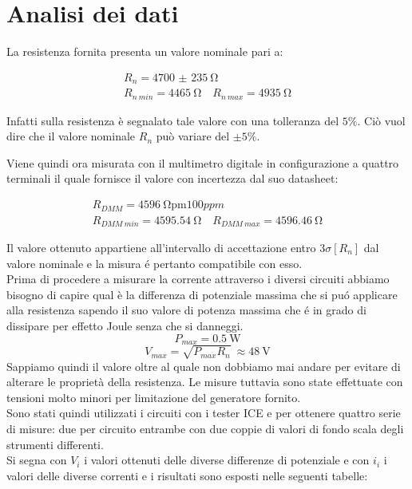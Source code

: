 \documentclass{article}
\begin{document}
\newpage


\section{Analisi dei dati}

La resistenza fornita presenta un valore nominale pari a:

\begin{gather}
    R_n = \SI{4700(235)}{\ohm} \\
    \nonumber
    R_{n\ min} = \SI{4465}{\ohm} \quad
    R_{n\ max} = \SI{4935}{\ohm}
\end{gather}

Infatti sulla resistenza è segnalato tale valore con una tolleranza del $5\%$. Ciò vuol dire che il valore nominale $R_n$ può variare del $\pm 5\%$.

Viene quindi ora misurata con il multimetro digitale in configurazione a quattro terminali il quale fornisce il valore con incertezza dal suo datasheet:

\begin{gather}
    R_{DMM} = \SI{4596}{\ohm \pm 100 ppm} \\
    \nonumber
    R_{DMM\ min} = \SI{4595.54}{\ohm} \quad
    R_{DMM\ max} = \SI{4596.46}{\ohm}
\end{gather}

Il valore ottenuto appartiene all'intervallo di accettazione entro $3 \sigma[R_n]$ dal valore nominale e la misura \'e pertanto compatibile con esso. \\
Prima di procedere a misurare la corrente attraverso i diversi circuiti abbiamo bisogno di capire qual è la differenza di potenziale massima che si pu\'o applicare alla resistenza sapendo il suo valore di potenza massima che \'e in grado di dissipare per effetto Joule senza che si danneggi.
\begin{equation}
    P_{max} = 0.5\ \si{\watt}
\end{equation}
\begin{equation}
    V_{max} = \sqrt{P_{max}R_{n}}\ \approx \SI{48}{\volt}
\end{equation}
Sappiamo quindi il valore oltre al quale non dobbiamo mai andare per evitare di alterare le proprietà della resistenza. Le misure tuttavia sono state effettuate con tensioni molto minori per limitazione del generatore fornito. \\
Sono stati quindi utilizzati i circuiti con i tester ICE e per ottenere quattro serie di misure: due per circuito entrambe con due coppie di valori di fondo scala degli strumenti differenti.\\
Si segna con $V_i$ i valori ottenuti delle diverse differenze di potenziale e con $i_i$ i valori delle diverse correnti e i risultati sono esposti nelle seguenti tabelle:
\end{document}
